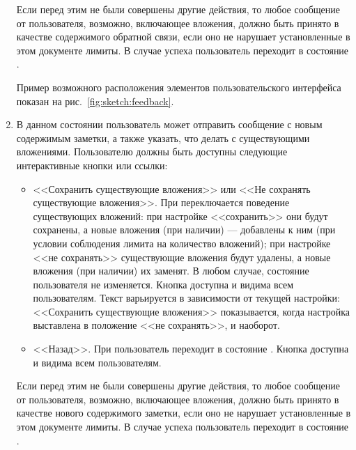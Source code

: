 \begin{enumerate}
            Если перед этим не были совершены другие действия, то любое сообщение от пользователя,
            возможно, включающее вложения, должно быть принято в качестве содержимого обратной связи,
            если оно не нарушает установленные в этом документе лимиты. В случае успеха
            пользователь переходит в состояние
            \hyperref[itm:req:ui:states:mainmenu]
            {}.

            Пример возможного расположения элементов пользовательского интерфейса показан на
            рис.~\ref{fig:sketch:feedback}.

        \item \label{itm:req:ui:states:edit-note}

            В данном состоянии пользователь может отправить сообщение с новым содержимым
            заметки, а также указать, что делать с существующими вложениями.
            Пользователю должны быть доступны следующие интерактивные кнопки или ссылки:
            \begin{itemize}
                \item
                    <<Сохранить существующие вложения>> или <<Не сохранять существующие вложения>>.
                    При  переключается поведение существующих вложений: при настройке
                    <<сохранить>> они будут сохранены, а новые вложения (при наличии)
                    --- добавлены к ним (при условии соблюдения лимита на количество вложений);
                    при настройке <<не сохранять>> существующие вложения будут удалены, а новые
                    вложения (при наличии) их заменят.
                    В любом случае, состояние пользователя не изменяется.
                    Кнопка доступна и видима всем пользователям. Текст варьируется в зависимости от
                    текущей настройки: <<Сохранить существующие вложения>> показывается, когда настройка
                    выставлена в положение <<не сохранять>>, и наоборот.
                \item
                    <<Назад>>.
                    При  пользователь переходит в состояние
                    \hyperref[itm:req:ui:states:view-note]
                    {}.
                    Кнопка доступна и видима всем пользователям.
            \end{itemize}

            Если перед этим не были совершены другие действия, то любое сообщение от пользователя,
            возможно, включающее вложения, должно быть принято в качестве нового содержимого заметки,
            если оно не нарушает установленные в этом документе лимиты. В случае успеха
            пользователь переходит в состояние
            \hyperref[itm:req:ui:states:view-note]
            {}.


\end{enumerate}
